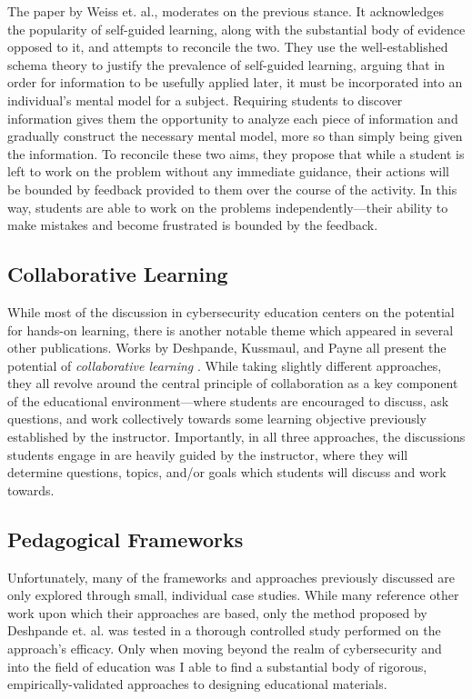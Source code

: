     The paper by Weiss et. al., moderates on the previous stance. It acknowledges the popularity of self-guided learning, along with the substantial body of evidence opposed to it, and attempts to reconcile the two. They use the well-established schema theory to justify the prevalence of self-guided learning, arguing that in order for information to be usefully applied later, it must be incorporated into an individual's mental model for a subject. Requiring students to discover information gives them the opportunity to analyze each piece of information and gradually construct the necessary mental model, more so than simply being given the information. To reconcile these two aims, they propose that while a student is left to work on the problem without any immediate guidance, their actions will be bounded by feedback provided to them over the course of the activity. In this way, students are able to work on the problems independently---their ability to make mistakes and become frustrated is bounded by the feedback. 

\subsection{Collaborative Learning}

    While most of the discussion in cybersecurity education centers on the potential for hands-on learning, there is another notable theme which appeared in several other publications. 
    Works by Deshpande, Kussmaul, and Payne all present the potential of \emph{collaborative learning} \cite{P-Deshpande,C-Kussmaul,B-Payne}. While taking slightly different approaches, they all revolve around the central principle of collaboration as a key component of the educational environment---where students are encouraged to discuss, ask questions, and work collectively towards some learning objective previously established by the instructor. Importantly, in all three approaches, the discussions students engage in are heavily guided by the instructor, where they will determine questions, topics, and/or goals which students will discuss and work towards. 

\subsection{Pedagogical Frameworks}

    Unfortunately, many of the frameworks and approaches previously discussed are only explored through small, individual case studies. While many reference other work upon which their approaches are based, only the method proposed by Deshpande et. al. was tested in a thorough controlled study performed on the approach's efficacy. Only when moving beyond the realm of cybersecurity and into the field of education was I able to find a substantial body of rigorous, empirically-validated approaches to designing educational materials. 

